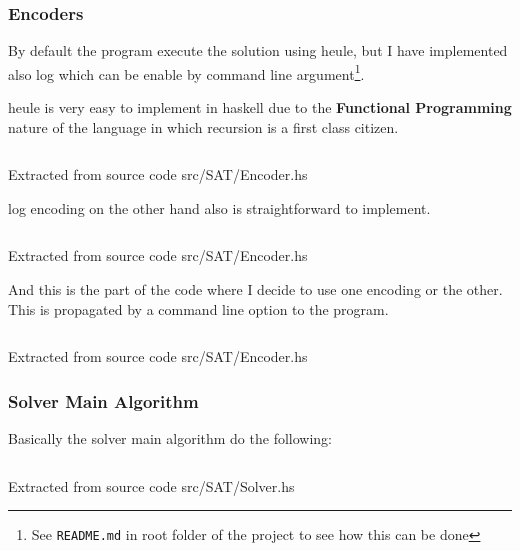 \documentclass[12pt, a4paper]{article}
\begin{document}
\subsubsection{Encoders}
By default the program execute the solution using \acrfull{heule}, but I have implemented also \acrfull{log} which can be enable by command line argument\footnote{See \texttt{README.md} in root folder of the project to see how this can be done}.

\acrlong{heule} is very easy to implement in \acrshort{haskell} due to the \textbf{Functional Programming} nature of the language in which recursion is a first class citizen.

\begin{listing}[H]
  \inputminted[firstline=54, lastline=73, linenos, breaklines]{haskell}{../src/SAT/Encoder.hs}
  \caption{Extracted from source code src/SAT/Encoder.hs}
  \label{src:sat:2}
\end{listing}

\acrlong{log} encoding on the other hand also is straightforward to implement.

\begin{listing}[H]
  \inputminted[firstline=76, lastline=85, linenos, breaklines]{haskell}{../src/SAT/Encoder.hs}
  \caption{Extracted from source code src/SAT/Encoder.hs}
  \label{src:sat:3}
\end{listing}

And this is the part of the code where I decide to use one encoding or the other. This is propagated by a command line option to the program.

\begin{listing}[H]
  \inputminted[firstline=49, lastline=52, linenos, breaklines]{haskell}{../src/SAT/Encoder.hs}
  \caption{Extracted from source code src/SAT/Encoder.hs}
  \label{src:sat:4}
\end{listing}

\subsubsection{Solver Main Algorithm}
Basically the solver main algorithm do the following:

\begin{listing}[H]
  \inputminted[firstline=30, lastline=54, linenos, breaklines]{haskell}{../src/SAT/Solver.hs}
  \caption{Extracted from source code src/SAT/Solver.hs}
  \label{src:sat:5}
\end{listing}
\end{document}
